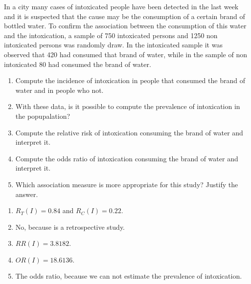{In a city many cases of intoxicated people have been detected in the last week and it is suspected that the cause may be the consumption of a certain brand of bottled water.
To confirm the association between the consumption of this water and the intoxication, a sample of 750 intoxicated persons and 1250 non intoxicated persons was randomly draw.
In the intoxicated sample it was observed that 420 had consumed that brand of water, while in the sample of non intoxicated 80 had consumed the brand of water.

\begin{enumerate}
\item Compute the incidence of intoxication in people that consumed the brand of water and in people who not. 
\item With these data, is it possible to compute the prevalence of intoxication in the popupalation?
\item Compute the relative risk of intoxication consuming the brand of water and interpret it.
\item Compute the odds ratio of intoxication consuming the brand of water and interpret it.
\item Which association measure is more appropriate for this study? Justify the answer.
\end{enumerate}
}
{
\begin{enumerate}
\item $R_T(I)=0.84$ and $R_C(I)=0.22$.
\item No, because is a retrospective study.
\item $RR(I)=3.8182$.
\item $OR(I)=18.6136$.
\item The odds ratio, because we can not estimate the prevalence of intoxication.
\end{enumerate}
}
{
}

